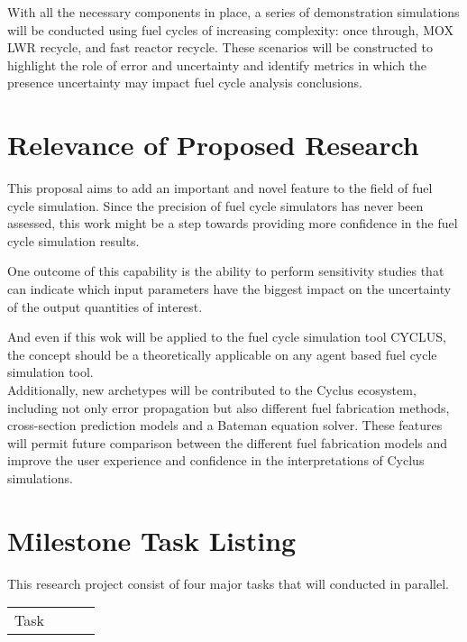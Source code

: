 \documentclass[dvips,12pt]{article}
\begin{document}
With all the necessary components in place, a
series of demonstration simulations will be
conducted using fuel cycles of increasing
complexity: once through, MOX LWR recycle, and
fast reactor recycle.  These scenarios will be
constructed to highlight the role of error and
uncertainty and identify metrics in which the
presence uncertainty may impact fuel cycle
analysis conclusions.

\section{Relevance of Proposed Research}

This proposal aims to add an important and novel
feature to the field of fuel cycle simulation.
Since the precision of fuel cycle simulators has
never been assessed, this work might be a step
towards providing more confidence in the fuel
cycle simulation results.  

One outcome of this capability is the ability to
perform sensitivity studies that can indicate
which input parameters have the biggest impact on
the uncertainty of the output quantities of
interest.

And even if this wok
will be applied to the fuel cycle simulation tool
CYCLUS, the concept should be a theoretically
applicable on any agent based fuel cycle
simulation tool.\\ Additionally, new archetypes
will be contributed to the Cyclus ecosystem,
including not only error propagation but also
different fuel fabrication methods, cross-section
prediction models and a Bateman equation
solver. These features will permit future
comparison between the different fuel fabrication
models and improve the user experience and
confidence in the interpretations of Cyclus
simulations.

\pagebreak
\section{Milestone Task Listing}

This research project consist of four major tasks
that will conducted in parallel.
\begin{tabular}{|c|c|c|c}
Task  & 
\end{tabular}
\end{document}
